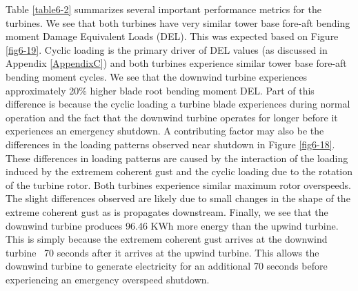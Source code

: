 Table \ref{table6-2} summarizes several important performance metrics for the turbines. We see that both turbines have very similar tower base fore-aft bending moment Damage Equivalent Loads (DEL). This was expected based on Figure \ref{fig6-19}. Cyclic loading is the primary driver of DEL values (as discussed in Appendix \ref{AppendixC}) and both turbines experience similar tower base fore-aft bending moment cycles. We see that the downwind turbine experiences approximately 20\% higher blade root bending moment DEL. Part of this difference is because the cyclic loading a turbine blade experiences during normal operation and the fact that the downwind turbine operates for longer before it experiences an emergency shutdown. A contributing factor may also be the differences in the loading patterns observed near shutdown in Figure \ref{fig6-18}. These differences in loading patterns are caused by the interaction of the loading induced by the extremem coherent gust and the cyclic loading due to the rotation of the turbine rotor. Both turbines experience similar maximum rotor overspeeds. The slight differences observed are likely due to small changes in the shape of the extreme coherent gust as is propagates downstream. Finally, we see that the downwind turbine produces 96.46 KWh more energy than the upwind turbine. This is simply because the extremem coherent gust arrives at the downwind turbine ~70 seconds after it arrives at the upwind turbine. This allows the downwind turbine to generate electricity for an additional 70 seconds before experiencing an emergency overspeed shutdown.

